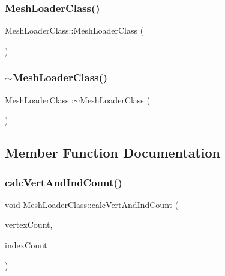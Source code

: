 \subsubsection{\texorpdfstring{Mesh\+Loader\+Class()}{MeshLoaderClass()}\hspace{0.1cm}{\footnotesize\ttfamily [2/2]}}
{\footnotesize\ttfamily Mesh\+Loader\+Class\+::\+Mesh\+Loader\+Class (\begin{DoxyParamCaption}\item[{const \hyperlink{class_mesh_loader_class}{Mesh\+Loader\+Class} \&}]{ }\end{DoxyParamCaption})}

\mbox{\label{class_mesh_loader_class_aae4c8aa70fd3f9c9696ced4517a57a36}} 
\subsubsection{\texorpdfstring{$\sim$\+Mesh\+Loader\+Class()}{~MeshLoaderClass()}}
{\footnotesize\ttfamily Mesh\+Loader\+Class\+::$\sim$\+Mesh\+Loader\+Class (\begin{DoxyParamCaption}{ }\end{DoxyParamCaption})}



\subsection{Member Function Documentation}
\mbox{\label{class_mesh_loader_class_a887583be3507cc1af5ce7b3d966bc4e5}} 
\subsubsection{\texorpdfstring{calc\+Vert\+And\+Ind\+Count()}{calcVertAndIndCount()}}
{\footnotesize\ttfamily void Mesh\+Loader\+Class\+::calc\+Vert\+And\+Ind\+Count (\begin{DoxyParamCaption}\item[{int \&}]{vertex\+Count,  }\item[{int \&}]{index\+Count }\end{DoxyParamCaption})\hspace{0.3cm}{\ttfamily [virtual]}}



